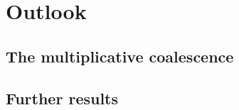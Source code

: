 
\chapter{Outlook} \label{C: outlook}


\section{The multiplicative coalescence}


\section{Further results}
